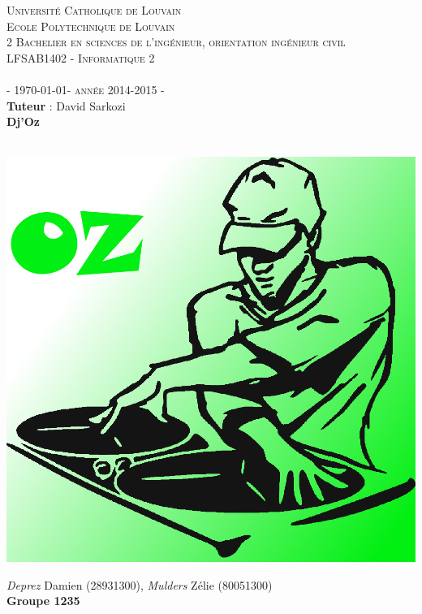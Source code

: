 \begin{titlepage}

\begin{center}
\textsc{\LARGE  Université Catholique de Louvain}\\[0.5cm]

\textsc{\large Ecole Polytechnique de Louvain\\ 2 Bachelier en sciences de l'ingénieur, orientation ingénieur civil\\ 
LFSAB1402 - Informatique 2}\\[1cm]

\textsc{\Large   \\  \vspace{0.8cm}- \today - année 2014-2015 -}\\[0.5cm]
{\large\textbf{Tuteur} : David Sarkozi }
\vspace{0.5cm}
\HRule \\[0.4cm]

{ \huge \bfseries Dj'Oz \\[0.4cm]}

\HRule \\[1.5cm]

\includegraphics[width=(\textwidth /2)]{DJOZ.png}

\vspace{1.0cm}

\emph{Deprez} Damien (28931300), \emph{Mulders} Zélie (80051300)\\

\textbf{Groupe 1235}

 
\end{center}
\end{titlepage}